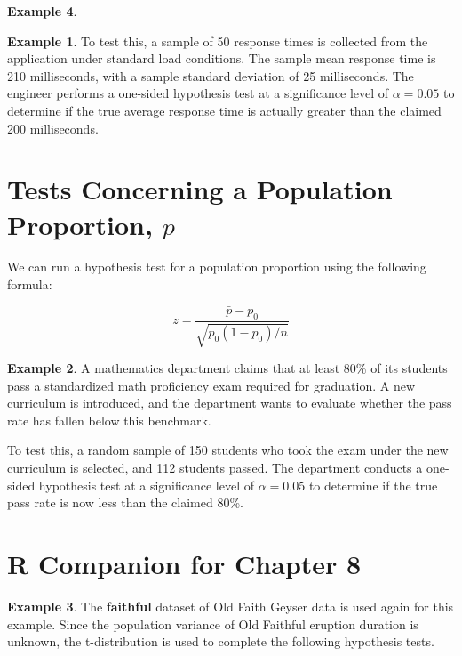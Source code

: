\documentclass[
  11pt,
  oneside]{book}
\theoremstyle{definition}
\theoremstyle{definition}
\newtheorem{example}{Example}[chapter]
\theoremstyle{definition}
\theoremstyle{definition}
\theoremstyle{remark}
\begin{document}
\begin{example}
\begin{example}
To test this, a sample of 50 response times is collected from the application under standard load conditions. The sample mean response time is 210 milliseconds, with a sample standard deviation of 25 milliseconds. The engineer performs a one-sided hypothesis test at a significance level of \(\alpha = 0.05\) to determine if the true average response time is actually greater than the claimed 200 milliseconds.
\end{example}

\vfill

\newpage

\section{\texorpdfstring{Tests Concerning a Population Proportion, \(p\)}{Tests Concerning a Population Proportion, p}}\label{tests-concerning-a-population-proportion-p}

We can run a hypothesis test for a population proportion using the following formula:

\[z = \frac{\bar{p}-p_0}{\sqrt{p_0(1-p_0)/n}}\]

\begin{example}
A mathematics department claims that at least 80\% of its students pass a standardized math proficiency exam required for graduation. A new curriculum is introduced, and the department wants to evaluate whether the pass rate has fallen below this benchmark.

To test this, a random sample of 150 students who took the exam under the new curriculum is selected, and 112 students passed. The department conducts a one-sided hypothesis test at a significance level of \(\alpha = 0.05\) to determine if the true pass rate is now less than the claimed 80\%.
\end{example}

\vfill

\newpage

\section{R Companion for Chapter 8}\label{r-companion-for-chapter-8}

\begin{example}
The \textbf{faithful} dataset of Old Faith Geyser data is used again for this example. Since the population variance of Old Faithful eruption duration is unknown, the t-distribution is used to complete the following hypothesis tests.
\end{example}


\end{example}
\end{document}
